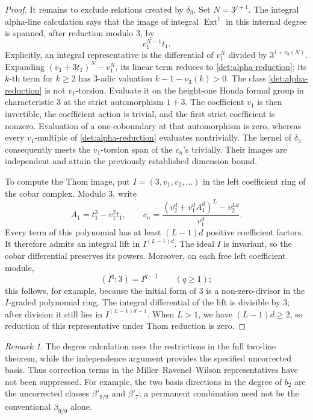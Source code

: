 \documentclass[11pt]{article}
\theoremstyle{definition}
\theoremstyle{remark}
\newtheorem{remark}[theorem]{Remark}
\numberwithin{equation}{section}
\begin{document}
\begin{proof}
It remains to exclude relations created by \(\delta_3\).
Set \(N=3^{j+1}\).  The integral alpha-line calculation
\cite[Theorem~2.2]{MRW} says that the image of integral
\(\operatorname{Ext}^1\) in this internal degree is spanned, after reduction
modulo \(3\), by
\begin{equation}\label{det:alpha-reduction}
 v_1^{N-1}t_1 .
\end{equation}
Explicitly, an integral representative is the differential of
\(v_1^N\) divided by \(3^{1+\nu_3(N)}\).
Expanding \((v_1+3t_1)^N-v_1^N\), its linear term reduces to
\eqref{det:alpha-reduction}; its \(k\)-th term for \(k\geq2\)
has \(3\)-adic valuation
\(k-1-\nu_3(k)>0\).
The class \eqref{det:alpha-reduction} is not \(v_1\)-torsion.
Evaluate it on the height-one Honda formal group in characteristic
\(3\) at the strict automorphism \(1+3\).
The coefficient \(v_1\) is then invertible, the coefficient action
is trivial, and the first strict coefficient is nonzero.
Evaluation of a one-coboundary at that automorphism is zero,
whereas every \(v_1\)-multiple of
\eqref{det:alpha-reduction} evaluates nontrivially.
The kernel of \(\delta_3\) consequently meets the
\(v_1\)-torsion span of the \(c_n\)'s trivially.
Their images are independent and attain the previously established
dimension bound.

To compute the Thom image, put
\(I=(3,v_1,v_2,\ldots)\) in the left coefficient ring of the
cobar complex.  Modulo \(3\), write
\[
 A_1=t_1^3-v_1^2t_1,\qquad
 c_n=\frac{(v_2^d+v_1^d A_1^d)^L-v_2^{Ld}}{v_1^d}.
\]
Every term of this polynomial has at least \((L-1)d\)
positive coefficient factors.  It therefore admits an integral
lift in \(I^{(L-1)d}\).
The ideal \(I\) is invariant, so the cobar differential preserves
its powers.  Moreover, on each free left coefficient module,
\[
 (I^q:3)=I^{q-1}\qquad(q\geq1);
\]
this follows, for example, because the initial form of \(3\)
is a non-zero-divisor in the \(I\)-graded polynomial ring.
The integral differential of the lift is divisible by \(3\);
after division it still lies in \(I^{(L-1)d-1}\).
When \(L>1\), we have \((L-1)d\geq2\), so reduction of
this representative under Thom reduction is zero.
\end{proof}

\begin{remark}\label{det:corrected-beta}
The degree calculation uses the restrictions in the full
two-line theorem, while the independence argument provides the
specified uncorrected basis.  Thus correction terms in the
Miller--Ravenel--Wilson representatives have not been suppressed.
For example, the two basis directions in the degree of \(b_2\)
are the uncorrected classes \(\beta'_{9/9}\) and \(\beta'_7\);
a permanent combination need not be the conventional
\(\beta_{9/9}\) alone.
\end{remark}
\end{document}
